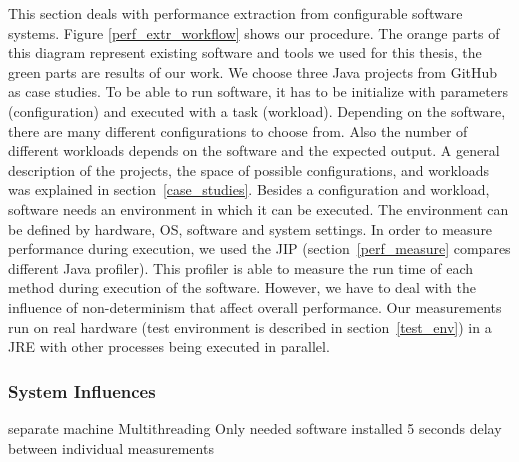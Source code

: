 This section deals with performance extraction from configurable software systems. Figure \ref{perf_extr_workflow} shows our procedure. The orange parts of this diagram represent existing software and tools we used for this thesis, the green parts are results of our work. We choose three Java projects from GitHub as case studies. To be able to run software, it has to be initialize with parameters (configuration) and executed with a task (workload). Depending on the software, there are many different configurations to choose from. Also the number of different workloads depends on the software and the expected output. A general description of the projects, the space of possible configurations, and workloads was explained in section~\ref{case_studies}. Besides a configuration and workload, software needs an environment in which it can be executed. The environment can be defined by hardware, \ac{OS}, software and system settings. In order to measure performance during execution, we used the \ac{JIP} (section~\ref{perf_measure} compares different Java profiler). This profiler is able to measure the run time of each method during execution of the software. However, we have to deal with the influence of non-determinism that affect overall performance. Our measurements run on real hardware (test environment is described in section~\ref{test_env}) in a \ac{JRE} with other processes being executed in parallel. 


\subsubsection{System Influences}

separate machine
Multithreading
Only needed software installed
5 seconds delay between individual measurements




